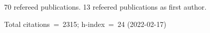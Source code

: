 70 refereed publications. 13 refeered publications as first author.

Total citations~=~2315; h-index~=~24 (2022-02-17)